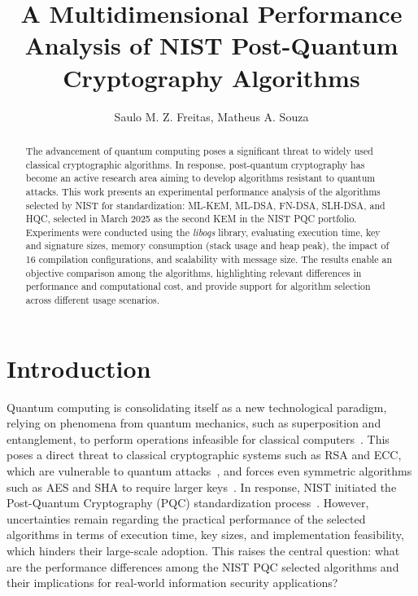 \documentclass[12pt]{article}
\title{A Multidimensional Performance Analysis of NIST Post-Quantum Cryptography Algorithms}
\author{Saulo M. Z. Freitas\inst{1}, Matheus A. Souza\inst{1}}
\begin{document}
\maketitle
\begin{abstract}
The advancement of quantum computing poses a significant threat to widely
used classical cryptographic algorithms. In response, post-quantum
cryptography has become an active research area aiming to develop
algorithms resistant to quantum attacks. This work presents an experimental
performance analysis of the algorithms selected by NIST for standardization:
ML-KEM, ML-DSA, FN-DSA, SLH-DSA, and HQC, selected in March 2025 as the
second KEM in the NIST PQC portfolio. Experiments were conducted using the
\textit{liboqs} library, evaluating execution time, key and signature sizes,
memory consumption (stack usage and heap peak), the impact of 16 compilation
configurations, and scalability with message size. The results enable an
objective comparison among the algorithms, highlighting relevant differences
in performance and computational cost, and provide support for algorithm
selection across different usage scenarios.
\end{abstract}
\section{Introduction}
\label{sec:intro}
Quantum computing is consolidating itself as a new technological paradigm,
relying on phenomena from quantum mechanics, such as superposition and
entanglement, to perform operations infeasible for classical
computers~\cite{Livro:nielsen:2010,feynman:82}. This poses a direct threat
to classical cryptographic systems such as RSA and ECC, which are vulnerable
to quantum attacks~\cite{shor:94}, and forces even symmetric algorithms such
as AES and SHA to require larger keys~\cite{grover:96}. In response, NIST
initiated the Post-Quantum Cryptography (PQC) standardization
process~\cite{NIST:2024}. However, uncertainties remain regarding the
practical performance of the selected algorithms in terms of execution time,
key sizes, and implementation feasibility, which hinders their large-scale
adoption. This raises the central question: what are the performance
differences among the NIST PQC selected algorithms and their implications
for real-world information security applications?
\end{document}
